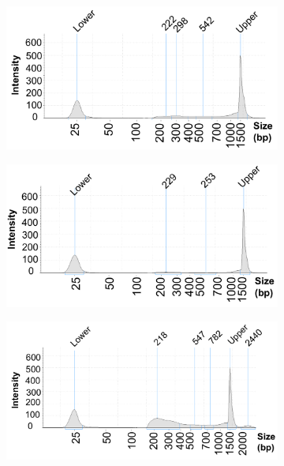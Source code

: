 \begin{figure}[htbp]
\centering
\begin{subfigure}{0.48\textwidth}
\centering
\includegraphics[width=\textwidth]{./Appendix/pdfs/Chapter3/FAST_ATAC_skin_tapestation_C1}
\caption{\textbf{}}
\end{subfigure}%
\begin{subfigure}{0.48\textwidth}
\centering
\includegraphics[width=\textwidth]{./Appendix/pdfs/Chapter3/FAST_ATAC_skin_tapestation_C3}
\caption{\textbf{}}
\end{subfigure}
\begin{subfigure}{0.48\textwidth}
\centering
\includegraphics[width=\textwidth]{./Appendix/pdfs/Chapter3/FAST_ATAC_skin_tapestation_C4}

\end{subfigure}
\end{figure}
